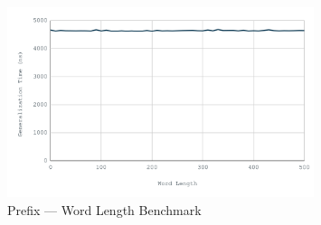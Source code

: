 \begin{figure}[H]
    \centering
    \includegraphics[width=0.8\textwidth]{images/prefix-word-length.png}
    \caption{Prefix --- Word Length Benchmark}\label{fig:prefix_word_length_bm}
\end{figure}